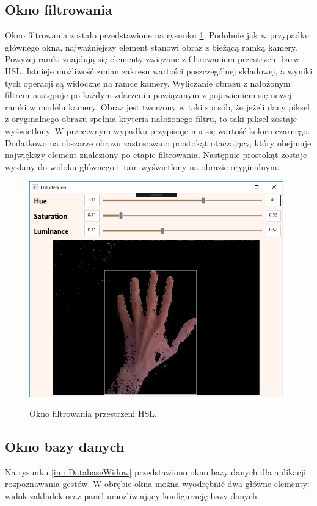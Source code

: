 \subsection{Okno filtrowania}
\label{subsec: HslFIlter}
Okno filtrowania zostało przedstawione na rysunku \ref{im: HslWindow}. Podobnie jak w  przypadku głównego okna, najważniejszy element stanowi obraz z bieżącą ramką kamery. Powyżej ramki znajdują się elementy związane z filtrowaniem przestrzeni barw HSL. Istnieje możliwość zmian zakresu wartości poszczególnej składowej, a wyniki tych operacji są widoczne na ramce kamery. Wyliczanie obrazu z nałożonym filtrem następuje po każdym zdarzeniu powiązanym z pojawieniem się nowej ramki w modelu kamery.
Obraz jest tworzony w taki sposób, że jeżeli dany piksel z oryginalnego obrazu spełnia kryteria nałożonego filtru, to taki piksel zostaje wyświetlony. W przeciwnym wypadku przypisuje mu się wartość koloru czarnego. Dodatkowo na obszarze obrazu zastosowano prostokąt otaczający, który obejmuje największy element znaleziony po etapie filtrowania. Następnie prostokąt zostaje wysłany do widoku głównego i~tam wyświetlony na obrazie oryginalnym.
\begin{figure}[h!]
	\centering
	\includegraphics[width=14cm]{HslWindow}
	\centering
	\caption{Okno filtrowania przestrzeni HSL.}
	\label{im: HslWindow}
\end{figure}
 
\newpage 
\subsection{Okno bazy danych}
\label{subsec: Database}
Na rysunku \ref{im: DatabaseWidow} przedstawiono okno bazy danych dla aplikacji rozpoznawania gestów. W obrębie okna można wyodrębnić dwa główne elementy: widok zakładek oraz panel umożliwiający konfigurację bazy danych. 

